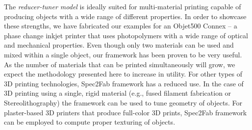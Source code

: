 The \emph{reducer-tuner model} is ideally suited for multi-material printing capable of producing objects with a wide range of different properties.
In order to showcase these strengths, we have fabricated our examples for an Objet500 Connex -- a phase change inkjet printer that uses photopolymers with a wide range of optical and mechanical properties. Even though only two materials can be used and mixed within a single object, our framework has been proven to be very useful. 
As the number of materials that can be printed simultaneously will grow, we expect the methodology presented here to increase in utility.
For other types of 3D printing technologies, Spec2Fab framework has a reduced use. In the case of 3D printing using a single, rigid material (e.g., fused filament fabrication or Stereolithography) the framework can be used to tune geometry of objects. For plaster-based 3D printers that produce full-color 3D prints, Spec2Fab framework can be employed to compute proper texturing of objects.




